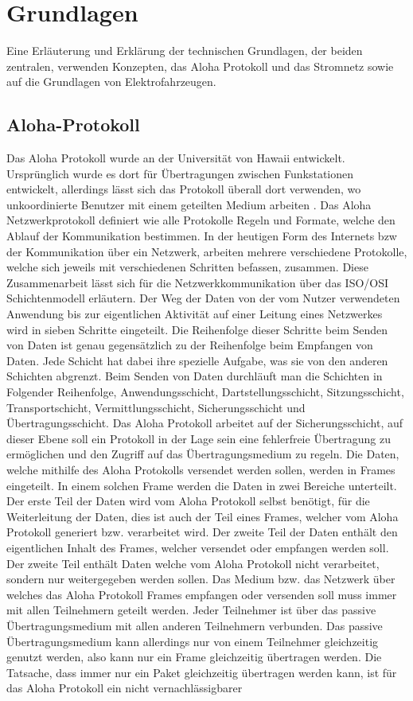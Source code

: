 \chapter{Grundlagen}
\label{chap:grundlagen}

Eine Erläuterung und Erklärung der technischen Grundlagen, der beiden zentralen, verwenden Konzepten, das Aloha Protokoll und das Stromnetz sowie auf die Grundlagen von Elektrofahrzeugen.
\section{Aloha-Protokoll}
\label{capBack:Aloha}
Das Aloha Protokoll wurde an der Universität von Hawaii entwickelt. Ursprünglich wurde es dort für Übertragungen zwischen Funkstationen entwickelt, allerdings lässt sich das Protokoll überall dort verwenden, wo unkoordinierte Benutzer mit einem geteilten Medium arbeiten \cite{Back_AlohaPure}. Das Aloha Netzwerkprotokoll definiert wie alle Protokolle Regeln und Formate, welche den Ablauf der Kommunikation bestimmen. In der heutigen Form des Internets bzw der Kommunikation über ein Netzwerk, arbeiten mehrere verschiedene Protokolle, welche sich jeweils mit verschiedenen Schritten befassen, zusammen. Diese Zusammenarbeit lässt sich für die Netzwerkkommunikation über das ISO/OSI Schichtenmodell erläutern. Der Weg der Daten von der vom Nutzer verwendeten Anwendung bis zur eigentlichen Aktivität auf einer Leitung eines Netzwerkes wird in sieben Schritte eingeteilt. Die Reihenfolge dieser Schritte beim Senden von Daten ist genau gegensätzlich zu der Reihenfolge beim Empfangen von Daten. Jede Schicht hat dabei ihre spezielle Aufgabe, was sie von den anderen Schichten abgrenzt. Beim Senden von Daten durchläuft man die Schichten in Folgender Reihenfolge, Anwendungsschicht, Dartstellungsschicht, Sitzungsschicht, Transportschicht, Vermittlungsschicht, Sicherungsschicht und Übertragungsschicht. Das Aloha Protokoll arbeitet auf der Sicherungsschicht, auf dieser Ebene soll ein Protokoll in der Lage sein eine fehlerfreie Übertragung zu ermöglichen und den Zugriff auf das Übertragungsmedium zu regeln. Die Daten, welche mithilfe des Aloha Protokolls versendet werden sollen, werden in Frames eingeteilt. In einem solchen Frame werden die Daten in zwei Bereiche unterteilt. Der erste Teil der Daten wird vom Aloha Protokoll selbst benötigt, für die Weiterleitung der Daten, dies ist auch der Teil eines Frames, welcher vom Aloha Protokoll generiert bzw. verarbeitet wird. Der zweite Teil der Daten enthält den eigentlichen Inhalt des Frames, welcher versendet oder empfangen werden soll. Der zweite Teil enthält Daten welche vom Aloha Protokoll nicht verarbeitet, sondern nur weitergegeben werden sollen. Das Medium bzw. das Netzwerk über welches das Aloha Protokoll Frames empfangen oder versenden soll muss immer mit allen Teilnehmern geteilt werden. Jeder Teilnehmer ist über das passive Übertragungsmedium mit allen anderen Teilnehmern verbunden. Das passive Übertragungsmedium kann allerdings nur von einem Teilnehmer gleichzeitig genutzt werden, also kann nur ein Frame gleichzeitig übertragen werden. Die Tatsache, dass immer nur ein Paket gleichzeitig übertragen werden kann, ist für das Aloha Protokoll ein nicht vernachlässigbarer 